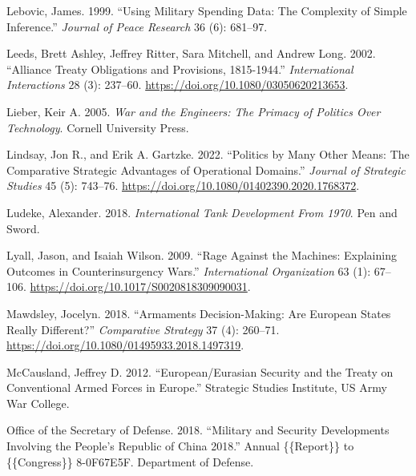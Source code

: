 \documentclass[
]{article}
\newlength{\cslhangindent}
\newlength{\cslentryspacingunit} %
\newenvironment{CSLReferences}[2] %
 {%
  \setlength{\parindent}{0pt}
  \ifodd #1
  \let\oldpar\par
  \def\par{\hangindent=\cslhangindent\oldpar}
  \fi
  \setlength{\parskip}{#2\cslentryspacingunit}
 }%
 {}
\begin{document}
\begin{CSLReferences}{1}{0}
\leavevmode{}%
Lebovic, James. 1999. {``Using {Military Spending Data}: {The Complexity} of {Simple Inference}.''} \emph{Journal of Peace Research} 36 (6): 681--97.

\leavevmode{}%
Leeds, Brett Ashley, Jeffrey Ritter, Sara Mitchell, and Andrew Long. 2002. {``Alliance {Treaty Obligations} and {Provisions}, 1815-1944.''} \emph{International Interactions} 28 (3): 237--60. \url{https://doi.org/10.1080/03050620213653}.

\leavevmode{}%
Lieber, Keir A. 2005. \emph{War and the {Engineers}: {The Primacy} of {Politics Over Technology}}. {Cornell University Press}.

\leavevmode{}%
Lindsay, Jon R., and Erik A. Gartzke. 2022. {``Politics by Many Other Means: {The} Comparative Strategic Advantages of Operational Domains.''} \emph{Journal of Strategic Studies} 45 (5): 743--76. \url{https://doi.org/10.1080/01402390.2020.1768372}.

\leavevmode{}%
Ludeke, Alexander. 2018. \emph{International {Tank Development From} 1970}. {Pen and Sword}.

\leavevmode{}%
Lyall, Jason, and Isaiah Wilson. 2009. {``Rage {Against} the {Machines}: {Explaining Outcomes} in {Counterinsurgency Wars}.''} \emph{International Organization} 63 (1): 67--106. \url{https://doi.org/10.1017/S0020818309090031}.

\leavevmode{}%
Mawdsley, Jocelyn. 2018. {``Armaments Decision-Making: {Are European} States Really Different?''} \emph{Comparative Strategy} 37 (4): 260--71. \url{https://doi.org/10.1080/01495933.2018.1497319}.

\leavevmode{}%
McCausland, Jeffrey D. 2012. {``European/{Eurasian Security} and the {Treaty} on {Conventional Armed Forces} in {Europe}.''} {Strategic Studies Institute, US Army War College}.

\leavevmode{}%
Office of the Secretary of Defense. 2018. {``Military and {Security Developments Involving} the {People}'s {Republic} of {China} 2018.''} Annual \{\{Report\}\} to \{\{Congress\}\} 8-0F67E5F. {Department of Defense}.


\end{CSLReferences}
\end{document}
